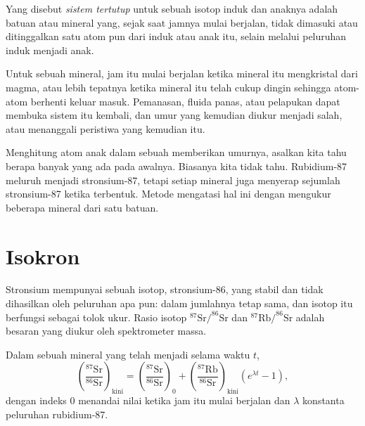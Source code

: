\begin{definition}\label{def:g12:age-of-the-earth:closed-system}
Yang disebut \emph{sistem tertutup} untuk sebuah isotop
induk dan anaknya adalah batuan atau mineral yang, sejak saat jamnya mulai
berjalan, tidak dimasuki atau ditinggalkan satu atom pun dari induk atau anak
itu, selain melalui peluruhan induk menjadi anak.
\end{definition}

Untuk sebuah mineral, jam itu mulai berjalan ketika mineral itu mengkristal dari
magma, atau lebih tepatnya ketika mineral itu telah cukup dingin sehingga atom-atom
berhenti keluar masuk. Pemanasan, fluida panas,
atau pelapukan dapat membuka sistem itu kembali, dan umur yang kemudian diukur
menjadi salah, atau menanggali peristiwa yang kemudian itu.

Menghitung atom anak dalam sebuah  memberikan umurnya, asalkan
kita tahu berapa banyak yang ada pada awalnya. Biasanya kita tidak tahu.
Rubidium-87 meluruh menjadi stronsium-87, tetapi setiap mineral juga menyerap
sejumlah stronsium-87 ketika terbentuk. Metode  mengatasi hal ini dengan
mengukur beberapa mineral dari satu batuan.

\section{Isokron}

Stronsium mempunyai sebuah isotop, stronsium-86, yang stabil dan tidak dihasilkan
oleh peluruhan apa pun: dalam  jumlahnya tetap sama, dan isotop
itu berfungsi sebagai tolok ukur. Rasio isotop $^{87}\mathrm{Sr}/^{86}\mathrm{Sr}$ dan
$^{87}\mathrm{Rb}/^{86}\mathrm{Sr}$ adalah besaran yang diukur oleh spektrometer massa.

\begin{theorem}\label{thm:g12:age-of-the-earth:isochron}
Dalam sebuah mineral yang telah menjadi  selama waktu $t$,
\[
  \left(\frac{^{87}\mathrm{Sr}}{^{86}\mathrm{Sr}}\right)_{\text{kini}}
  = \left(\frac{^{87}\mathrm{Sr}}{^{86}\mathrm{Sr}}\right)_{0}
  + \left(\frac{^{87}\mathrm{Rb}}{^{86}\mathrm{Sr}}\right)_{\text{kini}}
  \left(e^{\lambda t} - 1\right),
\]
dengan indeks 0 menandai nilai ketika jam itu mulai berjalan dan $\lambda$
konstanta peluruhan rubidium-87.
\end{theorem}

